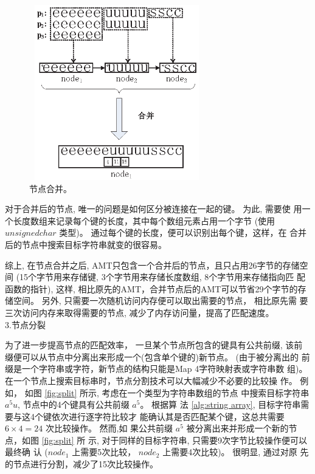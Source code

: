 \begin{figure}[H]
  \centering
  \includegraphics[height=3in, width=3in]{figures/2_MPM/node_merge}
  \caption{节点合并。}
  \label{fig:merge}
\end{figure}

对于合并后的节点, 唯一的问题是如何区分被连接在一起的键。 为此, 需要使
用一个长度数组来记录每个键的长度，其中每个数组元素占用一个字节 (使用
$unsigned char$ 类型)。 通过每个键的长度，便可以识别出每个键，这样，在
合并后的节点中搜索目标字符串就变的很容易。

综上, 在节点合并之后, AMT只包含一个合并后的节点，且只占用26字节的存储空
间 (15个字节用来存储键, 3个字节用来存储长度数组, 8个字节用来存储指向匹
配函数的指针), 这样, 相比原先的AMT，合并节点后的AMT可以节省29个字节的存
储空间。 另外, 只需要一次随机访问内存便可以取出需要的节点， 相比原先需
要三次访问内存来取得需要的节点, 减少了内存访问量，提高了匹配速度。\\

3.节点分裂

为了进一步提高节点的匹配效率， 一旦某个节点所包含的键具有公共前缀, 该前
缀便可以从节点中分离出来形成一个(包含单个键的)新节点。 (由于被分离出的
前缀是一个字符串或字符，新节点的结构只能是Map 4字符映射表或字符串数
组)。 在一个节点上搜索目标串时，节点分割技术可以大幅减少不必要的比较操
作。 例如， 如图 \ref{fig:split} 所示, 考虑在一个类型为字符串数组的节点
中搜索目标字符串 $a^5u$, 节点中的4个键具有公共前缀 $a^5$。 根据算
法 \ref{alg:string array}, 目标字符串需要与这4个键依次进行逐字符比较才
能确认其是否匹配某个键，这总共需要 $6 \times 4 = 24$ 次比较操作。 然而,如
果公共前缀 $a^5$ 被分离出来并形成一个新的节点，如图 \ref{fig:split} 所
示, 对于同样的目标字符串, 只需要9次字节比较操作便可以最终确
认 ($node_1$ 上需要5次比较， $node_2$ 上需要4次比较)。 很明显, 通过对原
先的节点进行分割，减少了15次比较操作。

